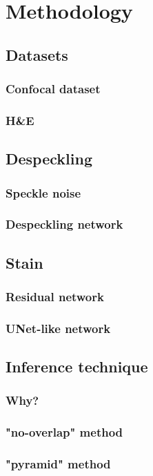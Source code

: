 \documentclass{beamer}
\begin{document}
\section{Methodology}

\subsection{Datasets}

\begin{frame}
\frametitle{Confocal dataset}
\end{frame}

\begin{frame}
\frametitle{H\&E}
\end{frame}

\subsection{Despeckling}

\begin{frame}
\frametitle{Speckle noise}
\end{frame}

\begin{frame}
\frametitle{Despeckling network}
\end{frame}

\subsection{Stain}

\begin{frame}
\frametitle{Residual network}
\end{frame}

\begin{frame}
\frametitle{UNet-like network}
\end{frame}

\subsection{Inference technique}

\begin{frame}
\frametitle{Why?}
\end{frame}

\begin{frame}
\frametitle{"no-overlap" method}
\end{frame}

\begin{frame}
\frametitle{"pyramid" method}
\end{frame}
\end{document}
